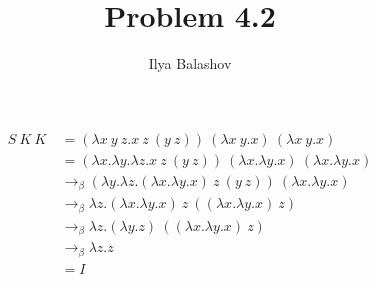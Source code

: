 \documentclass[12pt]{article}
\title{Problem 4.2}
\author{Ilya Balashov}
\date{}
\begin{document}
\maketitle

\begin{align*}
S\ K\ K\ & = (\lambda x\ y\ z.x\ z\ (y\ z))\ (\lambda x\ y.x)\ (\lambda x\ y.x) \\
& = (\lambda x.\lambda y.\lambda z.x\ z\ (y\ z))\ (\lambda x.\lambda y.x)\ (\lambda x. \lambda y.x) \\
& \longrightarrow_{\beta}  (\lambda y.\lambda z.(\lambda x.\lambda y.x)\ z\ (y\ z))\ (\lambda x.\lambda y.x) \\
& \longrightarrow_\beta \lambda z.(\lambda x.\lambda y.x)\ z\ ((\lambda x.\lambda y.x)\ z) \\
& \longrightarrow_\beta \lambda z.(\lambda y.z)\ ((\lambda x.\lambda y.x)\ z) \\ 
& \longrightarrow_\beta \lambda z.z \\
& = I
\end{align*}
\end{document}
